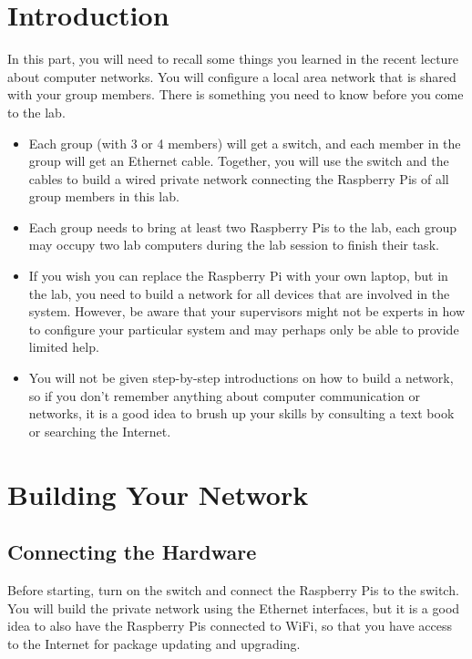 \documentclass{article}
\begin{document}
\section{Introduction}
In this part, you will need to recall some things you learned in the recent lecture about computer networks. You will configure a local area network that is shared with your group members. There is something you need to know before you come to the lab.
\begin{itemize}
    \item Each group (with 3 or 4 members) will get a switch, and each member in the group will get an Ethernet cable. Together, you will use the switch and the cables to build a wired private network connecting the Raspberry Pis of all group members in this lab.
    \item Each group needs to bring at least two Raspberry Pis to the lab, each group may occupy two lab computers during the lab session to finish their task.
    \item If you wish you can replace the Raspberry Pi with your own laptop, but in the lab, you need to build a network for all devices that are involved in the system. However, be aware that your supervisors might not be experts in how to configure your particular system and may perhaps only be able to provide limited help.
    \item You will not be given step-by-step introductions on how to build a network, so if you don't remember anything about computer communication or networks, it is a good idea to brush up your skills by consulting a text book or searching the Internet.
\end{itemize}

\section{Building Your Network}
\subsection{Connecting the Hardware}
Before starting, turn on the switch and connect the Raspberry Pis to the switch. You will build the private network using the Ethernet interfaces, but it is a good idea to also have the Raspberry Pis connected to WiFi, so that you have access to the Internet for package updating and upgrading.
\end{document}
